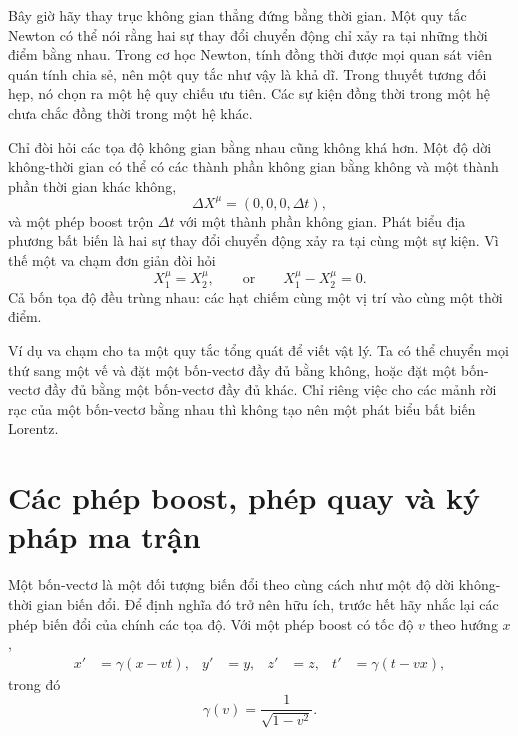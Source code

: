 Bây giờ hãy thay trục không gian thẳng đứng bằng thời gian. Một quy tắc Newton có thể nói rằng hai sự thay đổi chuyển động chỉ xảy ra tại những thời điểm bằng nhau. Trong cơ học Newton, tính đồng thời được mọi quan sát viên quán tính chia sẻ, nên một quy tắc như vậy là khả dĩ. Trong thuyết tương đối hẹp, nó chọn ra một hệ quy chiếu ưu tiên. Các sự kiện đồng thời trong một hệ chưa chắc đồng thời trong một hệ khác.

Chỉ đòi hỏi các tọa độ không gian bằng nhau cũng không khá hơn. Một độ dời không-thời gian có thể có các thành phần không gian bằng không và một thành phần thời gian khác không,
\begin{equation}
  \Delta X^\mu=(0,0,0,\Delta t),
\end{equation}
và một phép boost trộn \(\Delta t\) với một thành phần không gian. Phát biểu địa phương bất biến là hai sự thay đổi chuyển động xảy ra tại cùng một sự kiện. Vì thế một va chạm đơn giản đòi hỏi
\begin{equation}
  X_1^\mu=X_2^\mu,
  \qquad\text{or}\qquad
  X_1^\mu-X_2^\mu=0.
\end{equation}
Cả bốn tọa độ đều trùng nhau: các hạt chiếm cùng một vị trí vào cùng một thời điểm.

Ví dụ va chạm cho ta một quy tắc tổng quát để viết vật lý. Ta có thể chuyển mọi thứ sang một vế và đặt một bốn-vectơ đầy đủ bằng không, hoặc đặt một bốn-vectơ đầy đủ bằng một bốn-vectơ đầy đủ khác. Chỉ riêng việc cho các mảnh rời rạc của một bốn-vectơ bằng nhau thì không tạo nên một phát biểu bất biến Lorentz.

\section{Các phép boost, phép quay và ký pháp ma trận}

Một bốn-vectơ là một đối tượng biến đổi theo cùng cách như một độ dời không-thời gian biến đổi. Để định nghĩa đó trở nên hữu ích, trước hết hãy nhắc lại các phép biến đổi của chính các tọa độ. Với một phép boost có tốc độ \(v\) theo hướng \(x\),
\begin{align}
  x'&=\gamma(x-vt), & y'&=y, & z'&=z,
  & t'&=\gamma(t-vx),                                      \label{eq:l6-boost}
\end{align}
trong đó
\begin{equation}
  \gamma(v)=\frac{1}{\sqrt{1-v^2}}.
\end{equation}

\begin{classroomqa}
\end{classroomqa}

